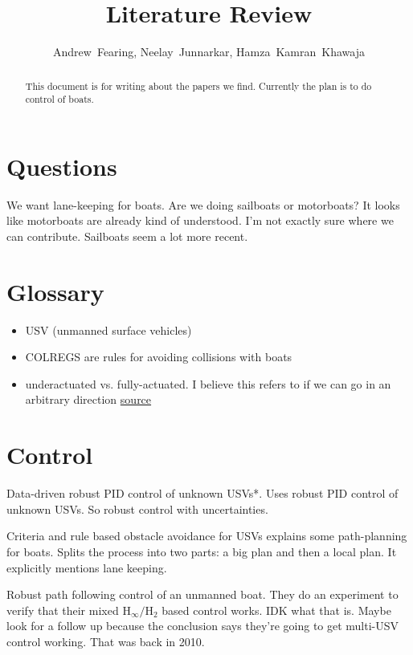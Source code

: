 \documentclass[conference]{IEEEtran}
\begin{document}
\title{Literature Review}
\author{Andrew~Fearing, Neelay~Junnarkar,  Hamza~Kamran~Khawaja}
\maketitle

\begin{abstract}
This document is for writing about the papers we find. Currently the plan is to do control of boats.
\end{abstract}

\section{Questions}
We want lane-keeping for boats. Are we doing sailboats or motorboats? It looks like motorboats are already kind of understood. I'm not exactly sure where we can contribute. Sailboats seem a lot more recent.


\section{Glossary}
\begin{itemize}
    \item USV (unmanned surface vehicles)
    \item COLREGS are rules for avoiding collisions with boats
    \item underactuated vs. fully-actuated. I believe this refers to if we can go in an arbitrary direction  \href{https://ocw.mit.edu/courses/electrical-engineering-and-computer-science/6-832-underactuated-robotics-spring-2009/readings/MIT6_832s09_read_ch01.pdf}{source}
\end{itemize}

\section{Control}
\cite{Nan2020} Data-driven robust PID control of unknown USVs*. Uses robust PID control of unknown USVs. So robust control with uncertainties.

\cite{Tan2010} Criteria and rule based obstacle avoidance for USVs explains some path-planning for boats. Splits the process into two parts: a big plan and then a local plan. It explicitly mentions lane keeping.

\cite{Yu2010} Robust path following control of an unmanned boat. They do an experiment to verify that their mixed \(\mathrm{H}_\infty / \mathrm{H}_2\) based control works. IDK what that is. Maybe look for a follow up because the conclusion says they're going to get multi-USV control working. That was back in 2010.
\end{document}
